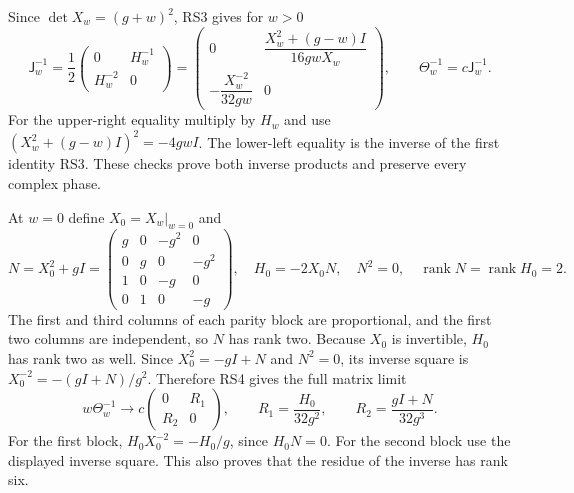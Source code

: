\documentclass[11pt]{article}
\newcommand{\R}{\mathbb R}
\newcommand{\rank}{\operatorname{rank}}
\begin{document}
Since $\det X_w=(g+w)^2$, RS3 gives for $w>0$
\begin{equation}
 \mathsf J_w^{-1}
 =\frac12\begin{pmatrix}0&H_w^{-1}\\H_w^{-2}&0\end{pmatrix}
 =\begin{pmatrix}
 0&\dfrac{X_w^2+(g-w)I}{16gwX_w}\\[4pt]
 -\dfrac{X_w^{-2}}{32gw}&0
 \end{pmatrix},\qquad
 \Theta_w^{-1}=c\mathsf J_w^{-1}.
 \tag{RS4}
\end{equation}
For the upper-right equality multiply by $H_w$ and use
$(X_w^2+(g-w)I)^2=-4gwI$. The lower-left equality is the
inverse of the first identity RS3. These checks prove both
inverse products and preserve every complex phase.

At $w=0$ define $X_0=X_w|_{w=0}$ and
\begin{equation}
 N=X_0^2+gI=
 \begin{pmatrix}g&0&-g^2&0\\0&g&0&-g^2\\1&0&-g&0\\0&1&0&-g\end{pmatrix},
 \quad H_0=-2X_0N,\quad
 N^2=0,\quad\rank N=\rank H_0=2.
 \tag{RS5}
\end{equation}
The first and third columns of each parity block are proportional,
and the first two columns are independent, so $N$ has rank two.
Because $X_0$ is invertible, $H_0$ has rank two as well.
Since $X_0^2=-gI+N$ and $N^2=0$, its inverse square is
$X_0^{-2}=-(gI+N)/g^2$. Therefore RS4 gives the full matrix limit
\begin{equation}
 w\Theta_w^{-1}\longrightarrow
 c\begin{pmatrix}0&R_1\\R_2&0\end{pmatrix},\qquad
 R_1=\frac{H_0}{32g^2},\qquad R_2=\frac{gI+N}{32g^3}.
 \tag{RS6}
\end{equation}
For the first block, $H_0X_0^{-2}=-H_0/g$, since $H_0N=0$.
For the second block use the displayed inverse square. This also
proves that the residue of the inverse has rank six.
\end{document}
